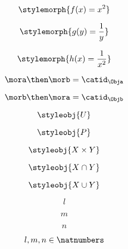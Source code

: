 {\begin{forslides}
 \begin{equation}\label{eq:28}
 \stylemorph{f(x) = x^2}
 \end{equation}
 
 \begin{equation}\label{eq:29}
 \stylemorph{g(y) = \frac{1}{y}}
 \end{equation}
 
 \begin{equation}\label{eq:30}
 \stylemorph{h(x) = \frac{1}{x^2}}
 \end{equation}
 
  \begin{equation}\label{eq:31}
 \mora \then \morb = \catid_\Obja
 \end{equation}
 
  \begin{equation}\label{eq:32}
 \morb \then \mora = \catid_\Objb
 \end{equation}
 
  \begin{equation}\label{eq:33}
 \styleobj{U}
 \end{equation}
 
   \begin{equation}\label{eq:34}
 \styleobj{P}
 \end{equation}
 
 \begin{equation}\label{eq:35}
 \styleobj{X \times Y}
 \end{equation}
 
  \begin{equation}\label{eq:36}
 \styleobj{X \cap Y}
 \end{equation}
 
 \begin{equation}\label{eq:37}
 \styleobj{X \cup Y}
 \end{equation}
 
  \begin{equation}\label{eq:38}
 l
 \end{equation}

  \begin{equation}\label{eq:39}
 m
 \end{equation}
 
   \begin{equation}\label{eq:40}
 n
 \end{equation}
 
  \begin{equation}\label{eq:41}
  l, m, n \in \natnumbers
 \end{equation}
 

\end{forslides}}
